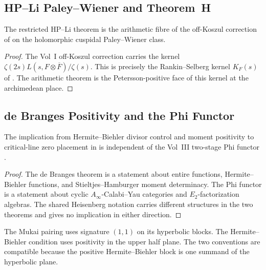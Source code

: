 \subsection{HP--Li Paley--Wiener and Theorem~H}
\label{v4-arith:w6-i:W5-A-alignment}

\begin{theorem}
\label{v4-arith:w6-i:thm:W5-A-alignment}
The restricted HP--Li theorem
 is the arithmetic fibre of the
off-Koszul correction of
 on the holomorphic
cuspidal Paley--Wiener class.
\end{theorem}

\begin{proof}
The Vol~I off-Koszul correction carries the kernel
\(\zeta(2s)L(s,F\otimes\overline F)/\zeta(s)\).  This is precisely the
Rankin--Selberg kernel \(K_F(s)\) of
.  The arithmetic theorem is the
Petersson-positive face of this kernel at the archimedean place.
\end{proof}

\subsection{de Branges Positivity and the Phi Functor}
\label{v4-arith:w6-i:W5-J-alignment}

\begin{theorem}
\label{v4-arith:w6-i:thm:W5-J-orthogonal}
The implication from Hermite--Biehler divisor control and moment
positivity to critical-line zero placement in
 is independent of the
Vol~III two-stage Phi functor
.
\end{theorem}

\begin{proof}
The de Branges theorem is a statement about entire functions,
Hermite--Biehler functions, and Stieltjes--Hamburger moment
determinacy.  The Phi functor is a statement about cyclic
\(A_\infty\)-Calabi--Yau categories and \(E_2\)-factorization
algebras.  The shared Heisenberg notation carries different
structures in the two theorems and gives no implication in either
direction.
\end{proof}

\begin{remark}
\label{v4-arith:w6-i:rem:W5-J-signature}
The Mukai pairing uses signature \((1,1)\) on its hyperbolic blocks.
The Hermite--Biehler condition uses positivity in the upper half
plane.  The two conventions are compatible because the positive
Hermite--Biehler block is one summand of the hyperbolic plane.
\end{remark}

